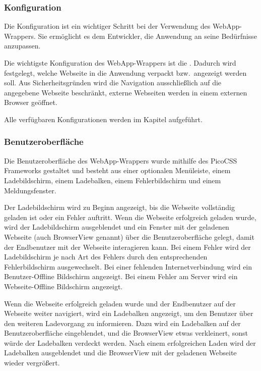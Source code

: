 \newpage

\subsubsection{Konfiguration}

Die Konfiguration ist ein wichtiger Schritt bei der Verwendung des WebApp-Wrappers.
Sie ermöglicht es dem Entwickler, die Anwendung an seine Bedürfnisse anzupassen.

Die wichtigste Konfiguration des WebApp-Wrappers ist die .
Dadurch wird festgelegt, welche Webseite in die Anwendung verpackt bzw.\ angezeigt werden soll.
Aus Sicherheitsgründen wird die Navigation ausschließlich auf die angegebene Webseite beschränkt, externe Webseiten werden in einem externen Browser geöffnet.

Alle verfügbaren Konfigurationen werden im Kapitel  aufgeführt.

\subsubsection{Benutzeroberfläche}

Die Benutzeroberfläche des WebApp-Wrappers wurde mithilfe des PicoCSS Frameworks gestaltet und besteht aus einer optionalen Menüleiste, einem Ladebildschirm, einem Ladebalken, einem Fehlerbildschirm und einem Meldungsfenster.

Der Ladebildschirm wird zu Beginn angezeigt, bis die Webseite vollständig geladen ist oder ein Fehler auftritt.
Wenn die Webseite erfolgreich geladen wurde, wird der Ladebildschirm ausgeblendet und ein Fenster mit der geladenen Webseite (auch BrowserView genannt) über die Benutzeroberfläche gelegt, damit der Endbenutzer mit der Webseite interagieren kann.
Bei einem Fehler wird der Ladebildschirm je nach Art des Fehlers durch den entsprechenden Fehlerbildschirm ausgewechselt.
Bei einer fehlenden Internetverbindung wird ein Benutzer-Offline Bildschirm angezeigt.
Bei einem Fehler am Server wird ein Webseite-Offline Bildschirm angezeigt.

Wenn die Webseite erfolgreich geladen wurde und der Endbenutzer auf der Webseite weiter navigiert, wird ein Ladebalken angezeigt, um den Benutzer über den weiteren Ladevorgang zu informieren.
Dazu wird ein Ladebalken auf der Benutzeroberfläche eingeblendet, und die BrowserView etwas verkleinert, sonst würde der Ladebalken verdeckt werden.
Nach einem erfolgreichen Laden wird der Ladebalken ausgeblendet und die BrowserView mit der geladenen Webseite wieder vergrößert.

